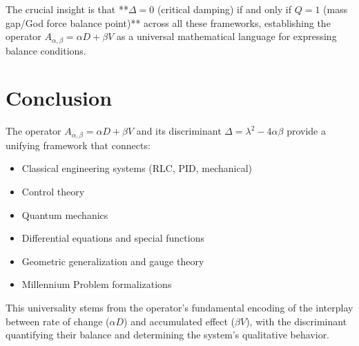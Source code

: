 \documentclass[11pt]{article}
\begin{document}
The crucial insight is that **$\Delta = 0$ (critical damping) if and only if $Q = 1$ (mass gap/God force balance point)** across all these frameworks, establishing the operator $A_{\alpha,\beta} = \alpha D + \beta V$ as a universal mathematical language for expressing balance conditions.

\section{Conclusion}
The operator $A_{\alpha,\beta} = \alpha D + \beta V$ and its discriminant $\Delta = \lambda^2 - 4\alpha\beta$ provide a unifying framework that connects:
\begin{itemize}
\item Classical engineering systems (RLC, PID, mechanical)
\item Control theory
\item Quantum mechanics
\item Differential equations and special functions
\item Geometric generalization and gauge theory
\item Millennium Problem formalizations
\end{itemize}

This universality stems from the operator's fundamental encoding of the interplay between rate of change ($\alpha D$) and accumulated effect ($\beta V$), with the discriminant quantifying their balance and determining the system's qualitative behavior.
\end{document}
